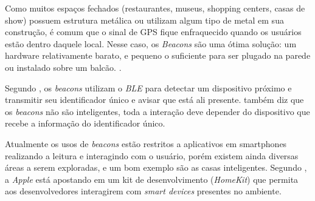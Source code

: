 \documentclass[
	12pt,				%
	openright,			%
	oneside,			%
	a4paper,			%
	chapter=TITLE,		%
	english,			%
	french,				%
	spanish,			%
	brazil				%
	]{abntex2}
\begin{document}
{\begin{citacao}
Como muitos espaços fechados (restaurantes, museus, shopping centers, casas de show) possuem estrutura metálica ou utilizam algum tipo de metal em sua construção, é comum que o sinal de GPS fique enfraquecido quando os usuários estão dentro daquele local. Nesse caso, os \textit{Beacons} são uma ótima solução: um hardware relativamente barato, e pequeno o suficiente para ser plugado na parede ou instalado sobre um balcão. \cite{teixeira-beacon}.
\end{citacao}

		\begin{figure}[h!]
		\end{figure}

Segundo , os \textit{beacons} utilizam o \textit{BLE} para detectar um dispositivo próximo e transmitir seu identificador único e avisar que está ali presente.  também diz que os \textit{beacons} não são inteligentes, toda a interação deve depender do dispositivo que recebe a informação do identificador único.

Atualmente os usos de \textit{beacons} estão restritos a aplicativos em smartphones realizando a leitura e interagindo com o usuário, porém existem ainda diversas áreas a serem exploradas, e um bom exemplo são as casas inteligentes. Segundo , a \textit{Apple} está apostando em um kit de desenvolvimento (\textit{HomeKit}) que permita aos desenvolvedores interagirem com \textit{smart devices} presentes no ambiente.


}
\end{document}
